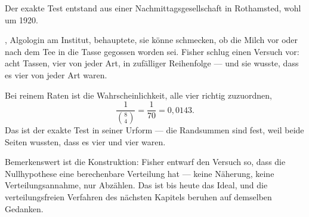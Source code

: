\begin{geschichte}
Der exakte Test entstand aus einer Nachmittagsgesellschaft in Rothamsted, wohl um 1920.

, Algologin am Institut, behauptete, sie könne schmecken, ob die Milch vor oder nach dem Tee in die Tasse gegossen worden sei. Fisher schlug einen Versuch vor: acht Tassen, vier von jeder Art, in zufälliger Reihenfolge --- und sie wusste, dass es vier von jeder Art waren.

Bei reinem Raten ist die Wahrscheinlichkeit, alle vier richtig zuzuordnen,
\[ \frac{1}{\binom{8}{4}} = \frac{1}{70} = 0{,}0143 . \]
Das ist der exakte Test in seiner Urform --- die Randsummen sind fest, weil beide Seiten wussten, dass es vier und vier waren.

\begin{center}
\begin{minipage}{0.9\textwidth}
\end{minipage}
\end{center}

Bemerkenswert ist die Konstruktion: Fisher entwarf den Versuch so, dass die Nullhypothese eine  berechenbare Verteilung hat --- keine Näherung, keine Verteilungsannahme, nur Abzählen. Das ist bis heute das Ideal, und die verteilungsfreien Verfahren des nächsten Kapitels beruhen auf demselben Gedanken.
\end{geschichte}

